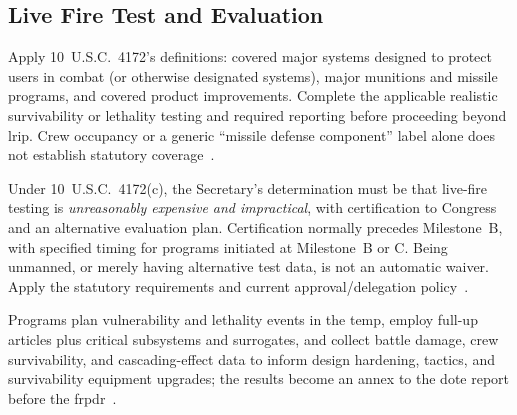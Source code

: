 \documentclass[../main.tex]{subfiles}
\begin{document}
\subsection{Live Fire Test and Evaluation}
\begin{description}[style=nextline,labelsep=0.5em,font=\bfseries]
  \item[\textbf{When required.}] Apply 10~U.S.C.\ 4172's definitions: covered major systems designed to protect users in combat (or otherwise designated systems), major munitions and missile programs, and covered product improvements. Complete the applicable realistic survivability or lethality testing and required reporting before proceeding beyond \ac{lrip}. Crew occupancy or a generic ``missile defense component'' label alone does not establish statutory coverage~\autocite{USC-10-4172,DoDI5000-98}.
  \item[\textbf{When waived.}] Under 10~U.S.C.\ 4172(c), the Secretary's determination must be that live-fire testing is \emph{unreasonably expensive and impractical}, with certification to Congress and an alternative evaluation plan. Certification normally precedes Milestone~B, with specified timing for programs initiated at Milestone~B or C. Being unmanned, or merely having alternative test data, is not an automatic waiver. Apply the statutory requirements and current approval/delegation policy~\autocite{USC-10-4172,DoDI5000-98}.
  \item[\textbf{Execution and use.}] Programs plan vulnerability and lethality events in the \ac{temp}, employ full-up articles plus critical subsystems and surrogates, and collect battle damage, crew survivability, and cascading-effect data to inform design hardening, tactics, and survivability equipment upgrades; the results become an annex to the \ac{dote} report before the \ac{frpdr}~\autocite{USC-10-4172,DoDI5000-98,DoDI5000-85}.
\end{description}
\end{document}
